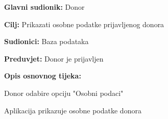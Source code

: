 					\begin{packed_item}
	
						\item \textbf{Glavni sudionik: }Donor
						\item \textbf{Cilj:} Prikazati osobne podatke prijavljenog donora
						\item \textbf{Sudionici:} Baza podataka
						\item \textbf{Preduvjet:} Donor je prijavljen
						\item \textbf{Opis osnovnog tijeka:}
						
						\item[] \begin{packed_enum}
	
							\item Donor odabire opciju "Osobni podaci"
							\item Aplikacija prikazuje osobne podatke donora
							
						\end{packed_enum}

					\end{packed_item}
\eject 
\noindent {}
